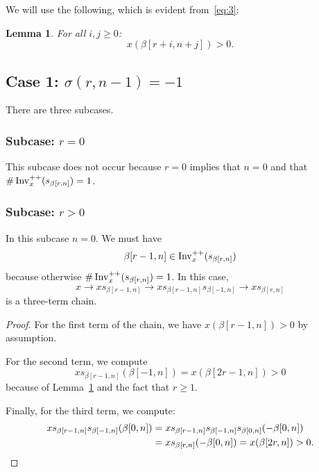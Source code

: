 \documentclass[10pt]{amsart}
\newtheorem{lemm}[theo]{Lemma}
\begin{document}
We will use the following, which is evident from~\eqref{eq:3}:

\begin{lemm}\label{lem:pos-prop-of-inv-plusplus}
For all $i,j\geq 0$:
\begin{equation}\label{eq:55}
x(\beta[r+i,n+j]) > 0.
\end{equation}
\end{lemm}

\subsection{Case 1: \texorpdfstring{$\sigma(r,n-1) = -1$}{sigma(r,n-1) = -1}}

There are three subcases.

\subsubsection{Subcase: \texorpdfstring{$r = 0$}{r = 0}}

This subcase does not occur because $r=0$ implies that $n=0$ and that $\# \operatorname{Inv}^{++}_x(s_{\beta[r,n]}) = 1$.

\subsubsection{Subcase: \texorpdfstring{$r > 0$}{r > 0}}

In this subcase $n=0$. We must have
\begin{equation}\label{eq:59}
\beta[r-1,n] \in \Invplusplusx(s_{\beta[r,n]})
\end{equation}
because otherwise $\# \operatorname{Inv}^{++}_x(s_{\beta[r,n]}) = 1$. In this case,
\begin{equation}\label{eq:58}
x \rightarrow x s_{\beta[r-1,n]} \rightarrow x s_{\beta[r-1,n]}s_{\beta[-1,n]} \rightarrow x s_{\beta[r,n]}
\end{equation}
is a three-term chain.

\begin{proof}
For the first term of the chain, we have $x(\beta[r-1,n]) > 0$ by assumption.

For the second term, we compute
\begin{equation}\label{eq:61}
x s_{\beta[r-1,n]} (\beta[-1,n]) = x(\beta[2r-1,n]) >0
\end{equation}
because of Lemma~\ref{lem:pos-prop-of-inv-plusplus} and the fact that $r \geq 1$.

Finally, for the third term, we compute:
\begin{align}\label{eq:63}
xs_{\beta[r-1,n]}s_{\beta[-1,n]}(\beta[0,n]) &= xs_{\beta[r-1,n]}s_{\beta[-1,n]}s_{\beta[0,n]}(- \beta[0,n])\\
&= xs_{\beta[r,n]}(- \beta[0,n]) = x(\beta[2r,n])>0.\notag\qedhere
\end{align}
\end{proof}
\end{document}
